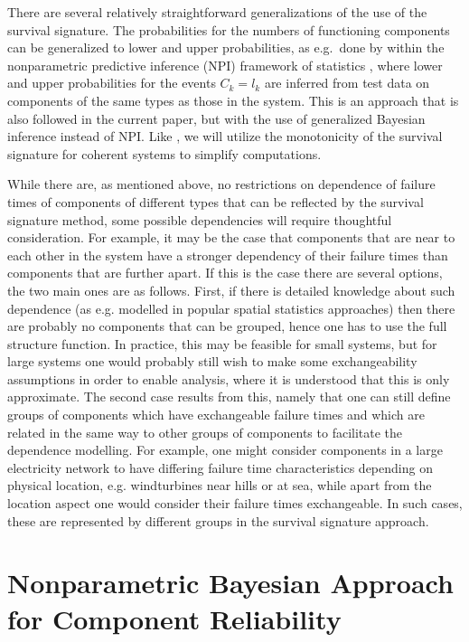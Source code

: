 \documentclass[12pt, a4paper]{elsarticle}
\begin{document}
There are several relatively straightforward generalizations of the use of the survival signature.
The probabilities for the numbers of functioning components can be generalized to lower and upper probabilities,
as e.g.\ done by \citet{CCMA14} within the nonparametric predictive inference (NPI) framework of statistics \citep{Co11},
where lower and upper probabilities for the events $C_k = l_k$
are inferred from test data on components of the same types as those in the system.
This is an approach that is also followed in the current paper, but with the use of generalized Bayesian inference instead of NPI.
Like \citet{CCMA14}, we will utilize the monotonicity of the survival signature for coherent systems
to simplify computations.

While there are, as mentioned above, no restrictions on dependence of failure times of components of different types that can be reflected by the survival signature method, some possible dependencies will require thoughtful consideration.
For example, it may be the case that components that are near to each other in the system have a stronger dependency of their failure times than components that are further apart.
If this is the case there are several options, the two main ones are as follows.
First, if there is detailed knowledge about such dependence (as e.g. modelled in popular spatial statistics approaches) then there are probably no components that can be grouped, hence one has to use the full structure function.
In practice, this may be feasible for small systems, but for large systems one would probably still wish to make some exchangeability assumptions in order to enable analysis, where it is understood that this is only approximate.
The second case results from this, namely that one can still define groups of components which have exchangeable failure times and which are related in the same way to other groups of components to facilitate the dependence modelling.
For example, one might consider components in a large electricity network to have differing failure time characteristics depending on physical location, e.g. windturbines near hills or at sea, while apart from the location aspect one would consider their failure times exchangeable.
In such cases, these are represented by different groups in the survival signature approach.


\section{Nonparametric Bayesian Approach for Component Reliability}
\label{sec:nonparamapproach}
\end{document}
